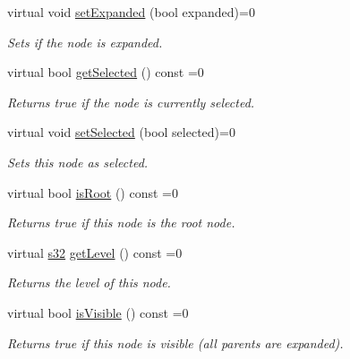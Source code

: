 \begin{DoxyCompactItemize}
\mbox{\label{classirr_1_1gui_1_1IGUITreeViewNode_a1b51ea8f10dcaf1d10f22419da18574a}} 
virtual void \hyperlink{classirr_1_1gui_1_1IGUITreeViewNode_a1b51ea8f10dcaf1d10f22419da18574a}{set\+Expanded} (bool expanded)=0
\begin{DoxyCompactList}\small\item\em Sets if the node is expanded. \end{DoxyCompactList}\item 
\mbox{\label{classirr_1_1gui_1_1IGUITreeViewNode_a9ea16f64f6a1487942c2666c031f78fc}} 
virtual bool \hyperlink{classirr_1_1gui_1_1IGUITreeViewNode_a9ea16f64f6a1487942c2666c031f78fc}{get\+Selected} () const =0
\begin{DoxyCompactList}\small\item\em Returns true if the node is currently selected. \end{DoxyCompactList}\item 
\mbox{\label{classirr_1_1gui_1_1IGUITreeViewNode_aaf71e030c2cf57a20bee59ab53cd997b}} 
virtual void \hyperlink{classirr_1_1gui_1_1IGUITreeViewNode_aaf71e030c2cf57a20bee59ab53cd997b}{set\+Selected} (bool selected)=0
\begin{DoxyCompactList}\small\item\em Sets this node as selected. \end{DoxyCompactList}\item 
\mbox{\label{classirr_1_1gui_1_1IGUITreeViewNode_a8dc2086fa899b190b1d7794610b5b06f}} 
virtual bool \hyperlink{classirr_1_1gui_1_1IGUITreeViewNode_a8dc2086fa899b190b1d7794610b5b06f}{is\+Root} () const =0
\begin{DoxyCompactList}\small\item\em Returns true if this node is the root node. \end{DoxyCompactList}\item 
virtual \hyperlink{namespaceirr_ac66849b7a6ed16e30ebede579f9b47c6}{s32} \hyperlink{classirr_1_1gui_1_1IGUITreeViewNode_aa57cadea8ba12bb3533ecf2845cd7971}{get\+Level} () const =0
\begin{DoxyCompactList}\small\item\em Returns the level of this node. \end{DoxyCompactList}\item 
\mbox{\label{classirr_1_1gui_1_1IGUITreeViewNode_a8b292990c1a9c7d368d870c82d610c31}} 
virtual bool \hyperlink{classirr_1_1gui_1_1IGUITreeViewNode_a8b292990c1a9c7d368d870c82d610c31}{is\+Visible} () const =0
\begin{DoxyCompactList}\small\item\em Returns true if this node is visible (all parents are expanded). \end{DoxyCompactList}\end{DoxyCompactItemize}
